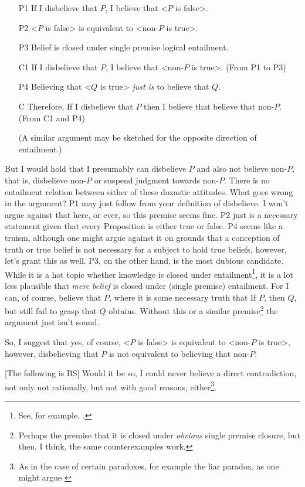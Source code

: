 \documentclass[12pt,numbers=noenddot]{scrartcl}
\begin{document}
\begin{enumerate}
\item [P1] If I disbelieve that $P$, I believe that <$P$ is false>. 
\item [P2] <$P$ is false> is equivalent to <non-$P$ is true>.
\item [P3] Belief is closed under single premise logical entailment.
\item [C1] If I disbelieve that $P$, I believe that <non-$P$ is true>. (From P1 to P3)
\item [P4] Believing that <$Q$ is true> \emph{just is} to believe that $Q$.
\item [C] Therefore, If I disbelieve that $P$ then I believe that believe that non-$P$. (From C1 and P4)
\item [] (A similar argument may be sketched for the opposite direction of entailment.)
\end{enumerate}

But I would hold that I presumably can disbelieve $P$ and also not believe non-$P$, that is, disbelieve non-$P$ or suspend judgment towards non-$P$. There is no entailment relation between either of these doxastic attitudes. What goes wrong in the argument? P1 may just follow from your definition of disbelieve. I won't argue against that here, or ever, so this premise seems fine. P2 just is a necessary statement given that every Proposition is either true or false. P4 seems like a truism, although one might argue against it on grounds that a conception of truth or true belief is not necessary for a subject to hold true beliefs, however, let's grant this as well. P3, on the other hand, is the most dubious candidate. While it is a hot topic whether knowledge is closed under entailment\footnote{See, for example, \textcite{Dretske2005-DREIKC}.}, it is a lot less plausible that \emph{mere belief} is closed under (single premise) entailment. For I can, of course, believe that $P$, where it is some necessary truth that If $P$, then $Q$, but still fail to grasp that $Q$ obtains. Without this or a similar premise\footnote{Perhaps the premise that it is closed under \emph{obvious} single premise closure, but then, I think, the same counterexamples work.} the argument just isn't sound.

So, I suggest that yes, of course, <$P$ is false> is equivalent to <non-$P$ is true>, however, disbelieving that $P$ is not equivalent to believing that non-$P$.

[The following is BS]
Would it be so, I could never believe a direct contradiction, not only not rationally, but not with good reasons, either\footnote{As in the case of certain paradoxes, for example the liar paradox, as one might argue \textcite[415]{Priest1998-PRIWIS}}.
\end{document}
